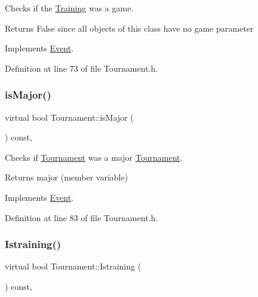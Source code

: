 Checks if the \hyperlink{class_training}{Training} was a game. 

\begin{DoxyReturn}{Returns}
False since all objects of this class have no game parameter 
\end{DoxyReturn}


Implements \hyperlink{class_event_add36e9739215f6744040c11de50b26b7}{Event}.



Definition at line 73 of file Tournament.\+h.

\hypertarget{class_tournament_af733baa05b3ae1465d6b5271929b5061}{}\label{class_tournament_af733baa05b3ae1465d6b5271929b5061} 
\subsubsection{\texorpdfstring{is\+Major()}{isMajor()}}
{\footnotesize\ttfamily virtual bool Tournament\+::is\+Major (\begin{DoxyParamCaption}{ }\end{DoxyParamCaption}) const\hspace{0.3cm}{\ttfamily [inline]}, {\ttfamily [virtual]}}



Checks if \hyperlink{class_tournament}{Tournament} was a major \hyperlink{class_tournament}{Tournament}. 

\begin{DoxyReturn}{Returns}
major (member variable) 
\end{DoxyReturn}


Implements \hyperlink{class_event_ad1a1a9cb471d664a2ca99effc102259b}{Event}.



Definition at line 83 of file Tournament.\+h.

\hypertarget{class_tournament_ab6fde765568ea9779fc10f0f2811c163}{}\label{class_tournament_ab6fde765568ea9779fc10f0f2811c163} 
\subsubsection{\texorpdfstring{Istraining()}{Istraining()}}
{\footnotesize\ttfamily virtual bool Tournament\+::\+Istraining (\begin{DoxyParamCaption}{ }\end{DoxyParamCaption}) const\hspace{0.3cm}{\ttfamily [inline]}, {\ttfamily [virtual]}}



